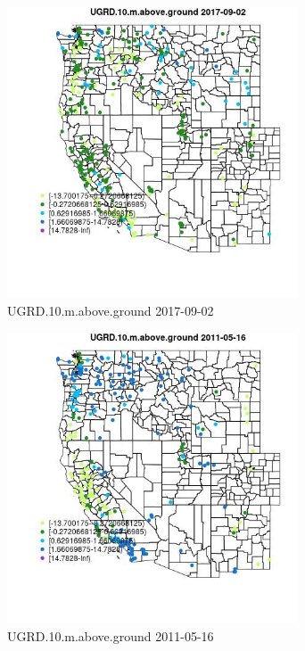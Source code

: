 \begin{figure} 
\centering  
\includegraphics[width=0.77\textwidth]{Code_Outputs/Report_ML_input_PM25_Step4_part_e_de_duplicated_aves_compiled_2019-05-21wNAs_MapObsUGRD10maboveground2017-09-02.jpg} 
\caption{\label{fig:Report_ML_input_PM25_Step4_part_e_de_duplicated_aves_compiled_2019-05-21wNAsMapObsUGRD10maboveground2017-09-02}UGRD.10.m.above.ground 2017-09-02} 
\end{figure} 
 

\clearpage 

\begin{figure} 
\centering  
\includegraphics[width=0.77\textwidth]{Code_Outputs/Report_ML_input_PM25_Step4_part_e_de_duplicated_aves_compiled_2019-05-21wNAs_MapObsUGRD10maboveground2011-05-16.jpg} 
\caption{\label{fig:Report_ML_input_PM25_Step4_part_e_de_duplicated_aves_compiled_2019-05-21wNAsMapObsUGRD10maboveground2011-05-16}UGRD.10.m.above.ground 2011-05-16} 
\end{figure} 
 

